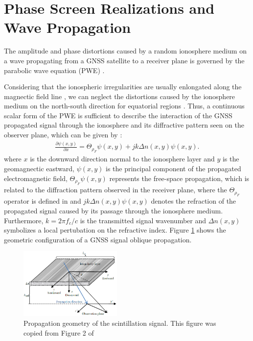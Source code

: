 \section{Phase Screen Realizations and Wave Propagation}
\label{sec:ps_theory}

The amplitude and phase distortions caused by a random ionosphere medium on a wave propagating from a GNSS satellite to a receiver plane is governed by the parabolic wave equation (PWE) \cite{rinoCompactMultifrequencyGNSS2018} \cite{rinoTheoryScintillationApplications2011} \cite{vasylyevModelingIonosphericScintillation2022}.

Considering that the ionospheric irregularities are usually enlongated along the magnectic field line \cite{SizeShapeOrientationOfEquatorialAnomalyScintillations}, we can neglect the distortions caused by the ionosphere medium on the north-south direction for equatorial regions \cite[Section III]{JiaoMultifrequencyScintillationOnGPSSignalsStaticPlatforms2018}. Thus, a continuous scalar form of the PWE is sufficient to describe the interaction of the GNSS propagated signal through the ionosphere and its diffractive pattern seen on the observer plane, which can be given by \cite[Equation 6]{rinoCompactMultifrequencyGNSS2018}:
\begin{align}
    \label{eq:PWE}
    \frac{\partial \psi\left( x, y \right)}{\partial x} = \Theta_{\rho_F} \psi \left( x, y \right) + j k \Delta n \left( x, y \right) \psi \left( x, y \right) \text{.}
\end{align}
where $x$ is the downward direction normal to the ionosphere layer and $y$ is the geomagnectic eastward, $\psi\left( x, y \right)$ is the principal component of the propagated electromagnetic field, $\Theta_{\rho_F} \psi \left( x, y \right)$ represents the free-space propagation, which is related to the diffraction pattern observed in the receiver plane, where the $\Theta_{\rho_F}$ operator is defined in \cite[Equation 7 and 8]{rinoCompactMultifrequencyGNSS2018} and $j k \Delta n \left( x, y \right) \psi \left( x, y \right)$ denotes the refraction of the propagated signal caused by its passage through the ionosphere medium. Furthermore, $k=2\pi f_c/c$ is the transmitted signal wavenumber and $\Delta n\left( x, y \right)$ symbolizes a local pertubation on the refractive index. Figure \ref{fig:propagation_geom} shows the geometric configuration of a GNSS signal oblique propagation.
\begin{figure}
    \centering
    \includegraphics[width=0.45\textwidth]{figures/Propagation Geometry - Yu Jiao.png}
    \caption{Propagation geometry of the scintillation signal. This figure was copied from Figure 2 of \cite{JiaoMultifrequencyScintillationOnGPSSignalsStaticPlatforms2018}}
    \label{fig:propagation_geom}
\end{figure}

